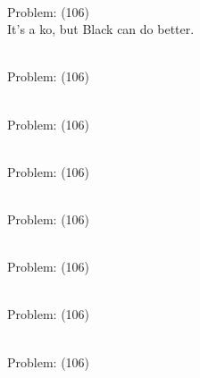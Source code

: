 \documentclass[11pt]{article}
\begin{document}
\begin{minipage}[t]{0.5\textwidth}
  {\centering
  
\\
Problem: (106)\\
It's a ko, but Black can do better.\\
  }
\end{minipage}
\begin{minipage}[t]{0.5\textwidth}
  {\centering
  
\\
Problem: (106)\\
  }
\end{minipage}
\begin{minipage}[t]{0.5\textwidth}
  {\centering
  
\\
Problem: (106)\\
  }
\end{minipage}
\begin{minipage}[t]{0.5\textwidth}
  {\centering
  
\\
Problem: (106)\\
  }
\end{minipage}
\begin{minipage}[t]{0.5\textwidth}
  {\centering
  
\\
Problem: (106)\\
  }
\end{minipage}
\begin{minipage}[t]{0.5\textwidth}
  {\centering
  
\\
Problem: (106)\\
  }
\end{minipage}
\begin{minipage}[t]{0.5\textwidth}
  {\centering
  
\\
Problem: (106)\\
  }
\end{minipage}
\begin{minipage}[t]{0.5\textwidth}
  {\centering
  
\\
Problem: (106)\\
  }
\end{minipage}
\end{document}
